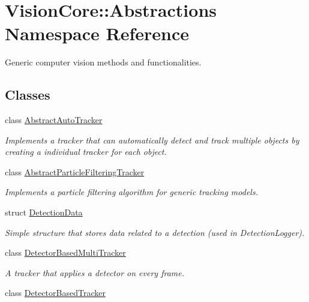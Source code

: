 \hypertarget{namespace_vision_core_1_1_abstractions}{}\section{Vision\+Core\+:\+:Abstractions Namespace Reference}
\label{namespace_vision_core_1_1_abstractions}


Generic computer vision methods and functionalities.  


\subsection*{Classes}
\begin{DoxyCompactItemize}
\item 
class \hyperlink{class_vision_core_1_1_abstractions_1_1_abstract_auto_tracker}{Abstract\+Auto\+Tracker}
\begin{DoxyCompactList}\small\item\em Implements a tracker that can automatically detect and track multiple objects by creating a individual tracker for each object. \end{DoxyCompactList}\item 
class \hyperlink{class_vision_core_1_1_abstractions_1_1_abstract_particle_filtering_tracker}{Abstract\+Particle\+Filtering\+Tracker}
\begin{DoxyCompactList}\small\item\em Implements a particle filtering algorithm for generic tracking models. \end{DoxyCompactList}\item 
struct \hyperlink{struct_vision_core_1_1_abstractions_1_1_detection_data}{Detection\+Data}
\begin{DoxyCompactList}\small\item\em Simple structure that stores data related to a detection (used in Detection\+Logger). \end{DoxyCompactList}\item 
class \hyperlink{class_vision_core_1_1_abstractions_1_1_detector_based_multi_tracker}{Detector\+Based\+Multi\+Tracker}
\begin{DoxyCompactList}\small\item\em A tracker that applies a detector on every frame. \end{DoxyCompactList}\item 
class \hyperlink{class_vision_core_1_1_abstractions_1_1_detector_based_tracker}{Detector\+Based\+Tracker}

\end{DoxyCompactItemize}
